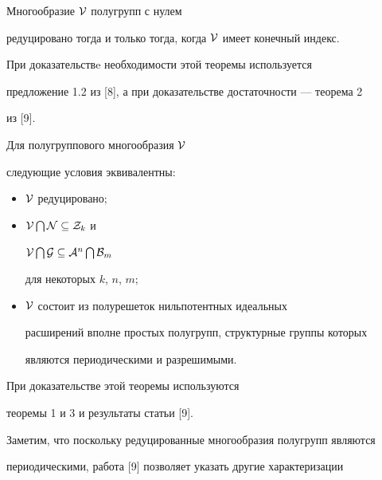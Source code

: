 \begin{thm}


Многообразие ${\cal V}$ полугрупп с нулем


редуцировано тогда и только тогда, когда ${\cal V}$ имеет конечный индекс.


\end{thm}





При доказательствe необходимости этой теоремы используется


предложение 1.2 из [8], а при доказательстве достаточности --- теорема 2


из [9]. 





\begin{thm}


Для полугруппового многообразия ${\cal V}$


следующие условия эквивалентны\/${:}$ 


\begin{itemize}


\item[(i)] ${\cal V}$ редуцировано$;$


\item[(ii)] ${\cal V}\bigcap {\cal N} \subseteq {\cal Z}_k$ и


${\cal V}\bigcap {\cal G} \subseteq {\cal A}^n\bigcap {\cal B}_m$


для некоторых $k$, $n$, $m;$ 


\item[(iii)] ${\cal V}$ состоит из полурешеток нильпотентных идеальных


расширений вполне простых полугрупп, структурные группы которых


являются периодическими и разрешимыми.


\end{itemize}


\end{thm}





При доказательстве этой теоремы используются


теоремы 1 и 3 и результаты статьи [9]. 





Заметим, что поскольку редуцированные многообразия полугрупп являются


периодическими, работа [9] позволяет указать другие характеризации


